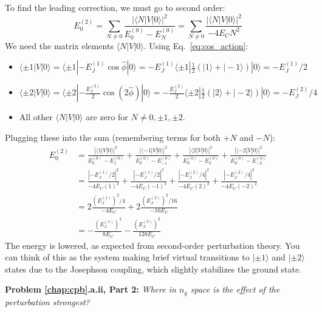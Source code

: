 \documentclass{book}
\newenvironment{problem}[1][Problem]{\par\medskip\noindent\textbf{#1:}\em}{\par\medskip}
\begin{document}
To find the leading correction, we must go to second order:
\begin{equation}
E_0^{(2)} = \sum_{N \neq 0} \frac{|\langle N | V | 0 \rangle|^2}{E_0^{(0)} - E_N^{(0)}} = \sum_{N \neq 0} \frac{|\langle N | V | 0 \rangle|^2}{-4 E_C N^2}
\end{equation}
We need the matrix elements \(\langle N | V | 0 \rangle\). Using Eq.~\ref{eq:cos_action}:
\begin{itemize}
    \item \(\langle \pm 1 | V | 0 \rangle = \langle \pm 1 | -E_J^{(1)} \cos\hat{\phi} | 0 \rangle = -E_J^{(1)} \langle \pm 1 | \frac{1}{2}(|1\rangle + |-1\rangle) | 0 \rangle = -E_J^{(1)}/2\)
    \item \(\langle \pm 2 | V | 0 \rangle = \langle \pm 2 | -\frac{E_J^{(2)}}{2} \cos(2\hat{\phi}) | 0 \rangle = -\frac{E_J^{(2)}}{2} \langle \pm 2 | \frac{1}{2}(|2\rangle + |-2\rangle) | 0 \rangle = -E_J^{(2)}/4\)
    \item All other \(\langle N | V | 0 \rangle\) are zero for \(N \neq 0, \pm 1, \pm 2\).
\end{itemize}
Plugging these into the sum (remembering terms for both \(+N\) and \(-N\)):
\begin{equation}
\begin{aligned}
E_0^{(2)} &= \frac{|\langle 1 | V | 0 \rangle|^2}{E_0^{(0)} - E_1^{(0)}} + \frac{|\langle -1 | V | 0 \rangle|^2}{E_0^{(0)} - E_{-1}^{(0)}} + \frac{|\langle 2 | V | 0 \rangle|^2}{E_0^{(0)} - E_2^{(0)}} + \frac{|\langle -2 | V | 0 \rangle|^2}{E_0^{(0)} - E_{-2}^{(0)}} \\
&= \frac{|-E_J^{(1)}/2|^2}{-4E_C (1)^2} + \frac{|-E_J^{(1)}/2|^2}{-4E_C (-1)^2} + \frac{|-E_J^{(2)}/4|^2}{-4E_C (2)^2} + \frac{|-E_J^{(2)}/4|^2}{-4E_C (-2)^2} \\
&= 2 \frac{(E_J^{(1)})^2 / 4}{-4 E_C} + 2 \frac{(E_J^{(2)})^2 / 16}{-16 E_C} \\
&= -\frac{(E_J^{(1)})^2}{8 E_C} - \frac{(E_J^{(2)})^2}{128 E_C}
\end{aligned}
\end{equation}
The energy is lowered, as expected from second-order perturbation theory. You can think of this as the system making brief virtual transitions to \(|\pm 1\rangle\) and \(|\pm 2\rangle\) states due to the Josephson coupling, which slightly stabilizes the ground state.

\begin{problem}[Problem \ref{chap:cpb}.a.ii, Part 2] 
Where in \(n_g\) space is the effect of the perturbation strongest?
\end{problem}
\end{document}
